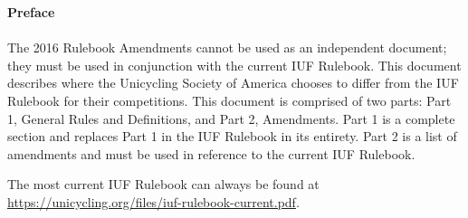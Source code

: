 {\huge \bf{Preface} \\}
\thispagestyle{plain}
\setcounter{page}{3}
\\
The 2016 Rulebook Amendments cannot be used as an independent document; they must be used in conjunction with the current IUF Rulebook. 
This document describes where the Unicycling Society of America chooses to differ from the IUF Rulebook for their competitions.
This document is comprised of two parts: Part 1, General Rules and Definitions, and Part 2, Amendments.
Part 1 is a complete section and replaces Part 1 in the IUF Rulebook in its entirety.
Part 2 is a list of amendments and must be used in reference to the current IUF Rulebook.

The most current IUF Rulebook can always be found at \url{https://unicycling.org/files/iuf-rulebook-current.pdf}.